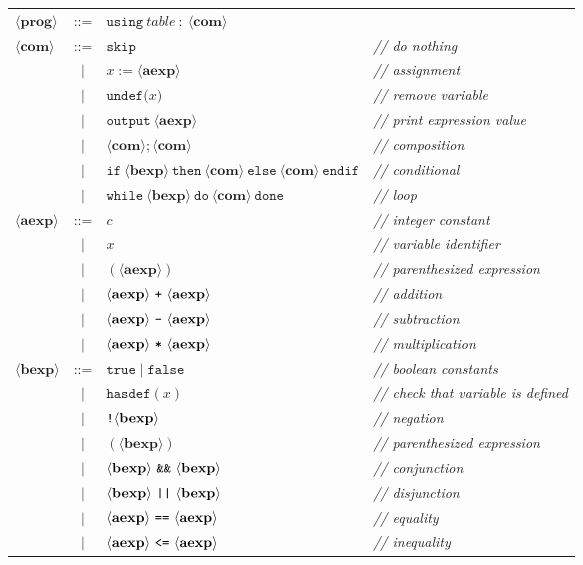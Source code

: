 \documentclass[11pt]{article}
\begin{document}
\begin{center}
\begin{tabular}{lcll}
$\langle\mathbf{prog}\rangle$ & ::= & $\mathtt{using}~\mathit{table}~\mathtt{:}~\langle\mathbf{com}\rangle$ &
\\
$\langle\mathbf{com}\rangle$ & ::= & $\mathtt{skip}$ & \textit{// do nothing}
\\
& $\mid$ & $x := \langle\mathbf{aexp}\rangle$ & \textit{// assignment}
\\
& $\mid$ & $\mathtt{undef(}x\mathtt{)}$ & \textit{// remove variable}
\\
& $\mid$ & $\mathtt{output}~\langle\mathbf{aexp}\rangle$ & \textit{// print expression value}
\\
& $\mid$ & $\langle\mathbf{com}\rangle\mathtt{;}\langle\mathbf{com}\rangle$ & \textit{// composition}
\\
& $\mid$ & $\mathtt{if}~\langle\mathbf{bexp}\rangle~\mathtt{then}~\langle\mathbf{com}\rangle~\mathtt{else}~\langle\mathbf{com}\rangle~\mathtt{endif}$ & \textit{// conditional}
\\
& $\mid$ & $\mathtt{while}~\langle\mathbf{bexp}\rangle~\mathtt{do}~\langle\mathbf{com}\rangle~\mathtt{done}$ & \textit{// loop}
\\
$\langle\mathbf{aexp}\rangle$ & ::= & $c$ & \textit{// integer constant}
\\
& $\mid$ & $x$ &  \textit{// variable identifier}
\\
& $\mid$ & $(\langle\mathbf{aexp}\rangle)$ &   \textit{// parenthesized expression}
\\
& $\mid$ & $\langle\mathbf{aexp}\rangle~\text{\texttt{+}}~\langle\mathbf{aexp}\rangle$ & \textit{// addition}
\\
& $\mid$ & $\langle\mathbf{aexp}\rangle~\text{\texttt{-}}~\langle\mathbf{aexp}\rangle$ & \textit{// subtraction}
\\
& $\mid$ & $\langle\mathbf{aexp}\rangle~\text{\texttt{*}}~\langle\mathbf{aexp}\rangle$ & \textit{// multiplication}
\\
$\langle\mathbf{bexp}\rangle$ & ::= & $\mathtt{true} \mid \mathtt{false}$ &  \textit{// boolean constants}
\\
& $\mid$ & $\mathtt{hasdef}(x)$ & \textit{// check that variable is defined}
\\
& $\mid$ & $\text{\texttt{!}}\langle\mathbf{bexp}\rangle$ & \textit{// negation}
\\
& $\mid$ & $(\langle\mathbf{bexp}\rangle)$ & \textit{// parenthesized expression}
\\
& $\mid$ & $\langle\mathbf{bexp}\rangle~\text{\texttt{\&\&}}~\langle\mathbf{bexp}\rangle$ & \textit{// conjunction}
\\
& $\mid$ & $\langle\mathbf{bexp}\rangle~\text{\texttt{||}}~\langle\mathbf{bexp}\rangle$ & \textit{// disjunction}
\\
& $\mid$ & $\langle\mathbf{aexp}\rangle~\text{\texttt{==}}~\langle\mathbf{aexp}\rangle$ & \textit{// equality}
\\
& $\mid$ & $\langle\mathbf{aexp}\rangle~\text{\texttt{<=}}~\langle\mathbf{aexp}\rangle$ & \textit{// inequality}
\end{tabular}
\end{center}
\end{document}
